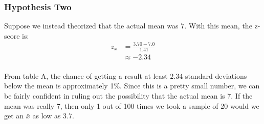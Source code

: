 \documentclass[letterpaper, landscape]{exam}
\begin{document}
  \subsubsection{Hypothesis Two}
  Suppose we instead theorized that the actual mean was 7. With this mean, the
  z-score is:
  \begin{align*}
    z_{\bar{x}} & = \frac{3.70 - 7.0}{1.41} \\
                & \approx -2.34 \\
  \end{align*}

  From table A, the chance of getting a result at least $2.34$ standard
  deviations below the mean is approximately 1\%. Since this is a pretty small
  number, we can be fairly confident in ruling out the possibility that the
  actual mean is 7. If the mean was really 7, then only 1 out of 100 times we
  took a sample of 20 would we get an $\bar{x}$ as low as 3.7.
\end{document}
